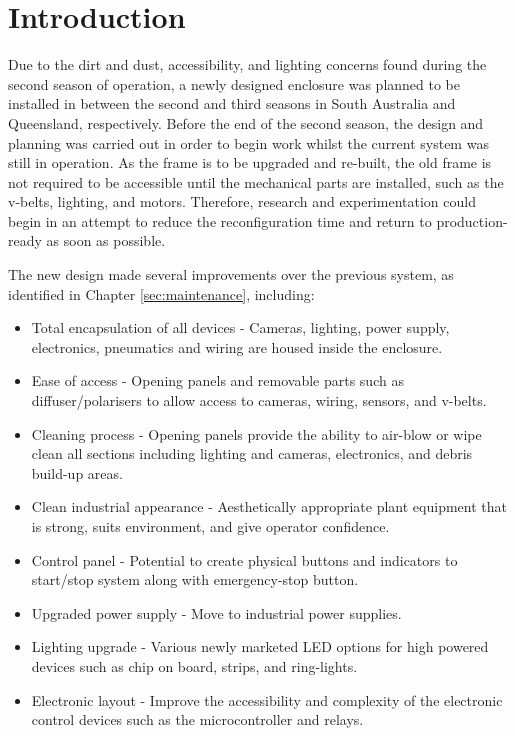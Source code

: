 \documentclass[fleqn,twoside,12pt]{report}
\begin{document}
\section{Introduction}


Due to the dirt and dust, accessibility, and lighting concerns found during the second season of operation, a newly designed enclosure was planned to be installed in between the second and third seasons in South Australia and Queensland, respectively. Before the end of the second season, the design and planning was carried out in order to begin work whilst the current system was still in operation. As the frame is to be upgraded and re-built, the old frame is not required to be accessible until the mechanical parts are installed, such as the v-belts, lighting, and motors. Therefore, research and experimentation could begin in an attempt to reduce the reconfiguration time and return to production-ready as soon as possible.

The new design made several improvements over the previous system, as identified in Chapter \ref{sec:maintenance}, including:

\begin{itemize}
	\item Total encapsulation of all devices - Cameras, lighting, power supply, electronics, pneumatics and wiring are housed inside the enclosure.
	\item Ease of access - Opening panels and removable parts such as diffuser/polarisers to allow access to cameras, wiring, sensors, and v-belts.
	\item Cleaning process - Opening panels provide the ability to air-blow or wipe clean all sections including lighting and cameras, electronics, and debris build-up areas.
	\item Clean industrial appearance - Aesthetically appropriate plant equipment that is strong, suits environment, and give operator confidence.
	\item Control panel - Potential to create physical buttons and indicators to start/stop system along with emergency-stop button.
	\item Upgraded power supply - Move to industrial power supplies.
	\item Lighting upgrade - Various newly marketed LED options for high powered devices such as chip on board, strips, and ring-lights.
	\item Electronic layout - Improve the accessibility and complexity of the electronic control devices such as the microcontroller and relays.
\end{itemize}
  
\end{document}
